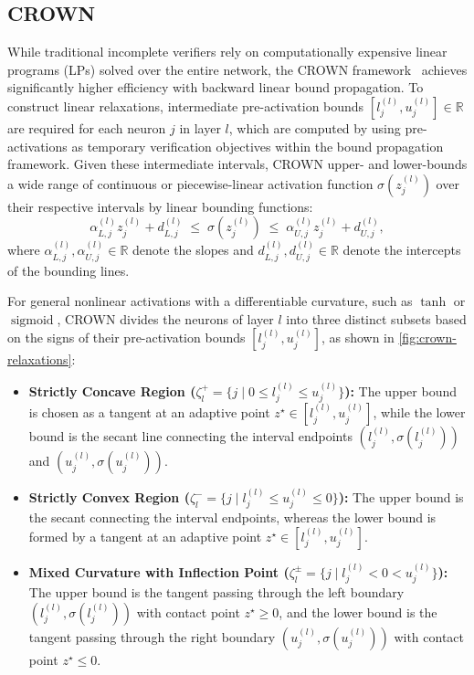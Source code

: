 \subsection{CROWN}
\label{subsec:crown}
While traditional incomplete verifiers rely on computationally expensive linear programs (LPs) solved over the entire network, 
the CROWN framework~\cite{zhangEfficientNeuralNetwork2018} achieves significantly higher efficiency with backward linear bound 
propagation. To construct linear relaxations, intermediate pre-activation bounds $[l_j^{(l)}, u_j^{(l)}] \in \mathbb{R}$ are 
required for each neuron $j$ in layer $l$, which are computed by using pre-activations as temporary verification objectives 
within the bound propagation framework.
Given these intermediate intervals, CROWN upper- and lower-bounds a wide range of continuous or piecewise-linear activation 
function $\sigma(z_j^{(l)})$ over their respective intervals by linear bounding functions:
\begin{equation}
    \alpha_{L,j}^{(l)} z_j^{(l)} + d_{L,j}^{(l)} 
    \;\le\; \sigma\!\left(z_j^{(l)}\right) \;\le\; 
    \alpha_{U,j}^{(l)} z_j^{(l)} + d_{U,j}^{(l)},
    \label{eq:crown-general-bounds}
\end{equation}
where $\alpha_{L,j}^{(l)}, \alpha_{U,j}^{(l)} \in \mathbb{R}$ denote the slopes and $d_{L,j}^{(l)}, d_{U,j}^{(l)} \in \mathbb{R}$ 
denote the intercepts of the bounding lines.

For general nonlinear activations with a differentiable curvature, such as $\tanh$ or $\operatorname{sigmoid}$, 
CROWN divides the neurons of layer $l$ into three distinct subsets based on the signs of their 
pre-activation bounds $[l_j^{(l)}, u_j^{(l)}]$, as shown in \cref{fig:crown-relaxations}:
\begin{itemize}
    \item \textbf{Strictly Concave Region ($\zeta_l^+ = \{j \mid 0 \le l_j^{(l)} \le u_j^{(l)}\}$):} 
        The upper bound is chosen as a tangent at an adaptive point $z^\star \in [l_j^{(l)}, u_j^{(l)}]$, 
        while the lower bound is the secant line connecting the interval endpoints $(l_j^{(l)}, \sigma(l_j^{(l)}))$ and 
        $(u_j^{(l)}, \sigma(u_j^{(l)}))$.
    \item \textbf{Strictly Convex Region ($\zeta_l^- = \{j \mid l_j^{(l)} \le u_j^{(l)} \le 0\}$):} 
        The upper bound is the secant connecting the interval endpoints, whereas the lower bound is formed by 
        a tangent at an adaptive point $z^\star \in [l_j^{(l)}, u_j^{(l)}]$.
    \item \textbf{Mixed Curvature with Inflection Point ($\zeta_l^\pm = \{j \mid l_j^{(l)} < 0 < u_j^{(l)}\}$):} 
        The upper bound is the tangent passing through the left boundary $(l_j^{(l)}, \sigma(l_j^{(l)}))$ with contact 
        point $z^\star \ge 0$, and the lower bound is the tangent passing through the right boundary $(u_j^{(l)}, \sigma(u_j^{(l)}))$ 
        with contact point $z^\star \le 0$.
\end{itemize}

